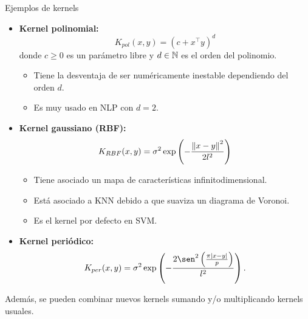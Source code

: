 \documentclass[handout, 9pt]{beamer}
\begin{document}
\begin{frame}{Ejemplos de kernels}

\begin{itemize}
	\item \textbf{Kernel polinomial:}
	\begin{equation*}
       K_{pol} (x, y) = (c + x^\top y)^d
    \end{equation*}
    donde $c\geq 0$ es un parámetro libre y $d\in{\mathbb N}$ es el orden del polinomio.
    \begin{itemize}
    	\item Tiene la desventaja de ser numéricamente inestable dependiendo del orden $d$.
    	\item Es muy usado en NLP con $d=2$.
    \end{itemize}
    
    \item \textbf{Kernel gaussiano (RBF): }
    \begin{equation*}
        K_{RBF} (x , y ) = \sigma^2 \exp\left(-\frac{\left\lVert x -y\right\rVert^2}{2l^2}\right)
    \end{equation*}
    \begin{itemize}
    	\item Tiene asociado un mapa de características infinitodimensional.
    	\item Está asociado a KNN debido a que suaviza un diagrama de Voronoi.
    	\item Es el kernel por defecto en SVM.
    \end{itemize}
    
    \item \textbf{Kernel periódico:}
    \begin{equation*}
       K_{per} (x , y) = \sigma^2 \exp\left(- \frac{2\sen^2 \left(\frac{\pi|x -y|}{p}\right)}{l^2}\right).
    \end{equation*}
\end{itemize}

Además, se pueden combinar nuevos kernels sumando y/o multiplicando kernels usuales.
	
\end{frame}
\end{document}
